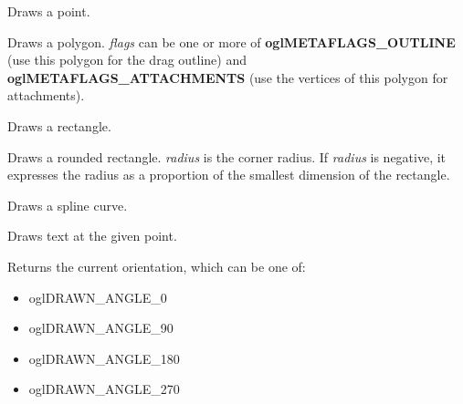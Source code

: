 Draws a point.

\label{wxdrawnshapedrawpolygon}


Draws a polygon. {\it flags} can be one or more of {\bf oglMETAFLAGS\_OUTLINE} (use this polygon for the drag outline)
and {\bf oglMETAFLAGS\_ATTACHMENTS} (use the vertices of this polygon for attachments).

\label{wxdrawnshapedrawrectangle}


Draws a rectangle.

\label{wxdrawnshapedrawroundedrectangle}


Draws a rounded rectangle. {\it radius} is the corner radius. If {\it radius} is negative,
it expresses the radius as a proportion of the smallest dimension of the rectangle.

\label{wxdrawnshapedrawspline}


Draws a spline curve.

\label{wxdrawnshapedrawtext}


Draws text at the given point.

\label{wxdrawnshapegetangle}


Returns the current orientation, which can be one of:

\begin{itemize}\itemsep=0pt
\item oglDRAWN\_ANGLE\_0
\item oglDRAWN\_ANGLE\_90
\item oglDRAWN\_ANGLE\_180
\item oglDRAWN\_ANGLE\_270
\end{itemize}

